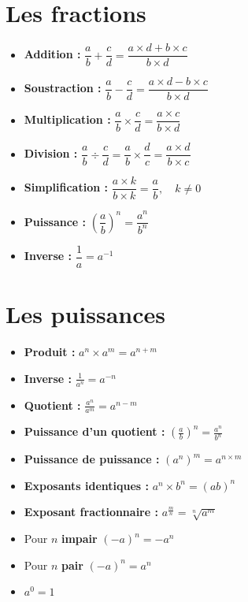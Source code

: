 \documentclass[12]{article}%
\theoremstyle{plain}
\theoremstyle{definition}
\theoremstyle{remark}
\begin{document}
\newpage
\section{Les fractions}
\large
\begin{itemize}
	\item \textbf{Addition :} \( \boxed{\dfrac{a}{b} + \dfrac{c}{d} = \dfrac{a \times d + b \times c}{b \times d}} \)
	\item \textbf{Soustraction :} \( \dfrac{a}{b} - \dfrac{c}{d} = \dfrac{a \times d - b \times c}{b \times d} \)
	\item \textbf{Multiplication :} \( \dfrac{a}{b} \times \dfrac{c}{d} = \dfrac{a \times c}{b \times d} \)
	\item \textbf{Division :} \( \dfrac{a}{b} \div \dfrac{c}{d} = \dfrac{a}{b} \times \dfrac{d}{c} = \dfrac{a \times d}{b \times c} \)
	\item \textbf{Simplification :} \( \dfrac{a \times k}{b \times k} = \dfrac{a}{b}, \quad k \neq 0 \)
	\item \textbf{Puissance :} \( \left (\dfrac{a}{b}\right )^{n} = \dfrac{a^{n}}{b^{n}} \)
	\item \textbf{Inverse :} \( \dfrac{1}{a} = a^{-1} \)
\end{itemize}
\newpage

\section{Les puissances}
\large
\begin{itemize}
	\item \textbf{Produit :} \( \boxed{a^{n}\times a^{m} = a^{n+m}} \)
	\item \textbf{Inverse :} \( \boxed{\frac{1}{a^{n}} = a^{-n}} \)
	\item \textbf{Quotient :} \( \boxed{\frac{a^{n}}{a^{m}} = a^{n-m}} \)
	\item \textbf{Puissance d'un quotient :} \( \boxed{\left( \frac{a}{b} \right)^n = \frac{a^n}{b^n}} \)
	\item \textbf{Puissance de puissance :} \( \boxed{(a^{n})^{m}=a^{n\times m}} \)
	\item \textbf{Exposants identiques :} \( \boxed{a^{n} \times b^{n} = (ab)^{n}} \)
	\item \textbf{Exposant fractionnaire :} \( \boxed{a^{\frac{m}{n}} = \sqrt[n]{a^m}} \)
	\item Pour $n$ \textbf{impair} \( \boxed{(-a)^{n} = -a^{n}} \)
	\item Pour $n$ \textbf{pair} \( \boxed{(-a)^{n} = a^{n}} \)
	\item \( \boxed{a^{0} = 1} \)
\end{itemize}
\newpage
\end{document}
